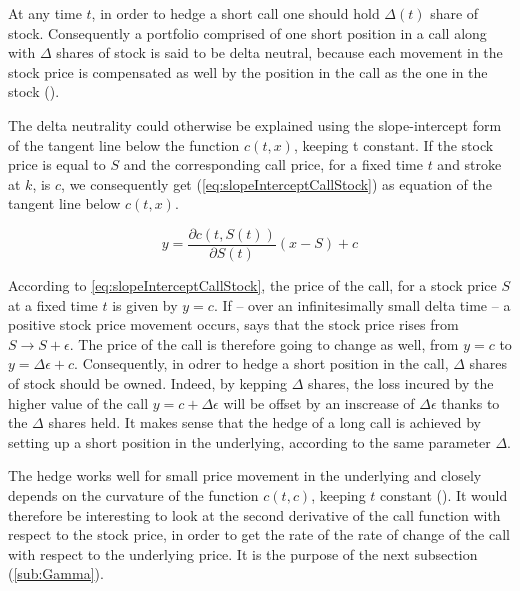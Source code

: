\documentclass[12pt]{report}
\newcommand{\call}[2]{c\left( #1, #2\right)}
\newcommand{\St}{S\left(t\right)}
\begin{document}
At any time $t$, in order to hedge a short call one should hold $\Delta(t)$ share of stock. Consequently a portfolio comprised of one short position in a call along with $\Delta$ shares of stock is said to be delta neutral, because each movement in the stock price is compensated as well by  the position in the call as the one in the stock (\citet{hull}).

The delta neutrality could otherwise be explained using the slope-intercept form of the tangent line below the function $\call{t}{x}$, keeping t constant. If the stock price is equal to $S$ and the corresponding call price, for a fixed time $t$ and stroke at $k$, is $c$, we consequently get (\ref{eq:slopeInterceptCallStock}) as equation of the tangent line below $\call{t}{x}$.
\begin{center}
  \begin{equation}
       y  =  \frac{\partial \call{t}{\St}}{\partial \St}  ( x - S) + c
       \label{eq:slopeInterceptCallStock}
  \end{equation}
\end{center}
According to \ref{eq:slopeInterceptCallStock}, the price of the call, for a stock price $S$ at a fixed time $t$ is given by $y = c$.
If -- over an infinitesimally small delta time -- a positive stock price movement occurs, says that the stock price rises from $S \to S + \epsilon$. The price of the call is therefore going to change as well, from $y = c$ to $y = \Delta \epsilon + c$.
Consequently, in odrer to hedge a short position in the call, $\Delta$ shares of stock should be owned. Indeed, by kepping $\Delta$ shares, the loss incured by the higher value of the call $y = c + \Delta \epsilon$ will be offset by an inscrease of $\Delta \epsilon$ thanks to the $\Delta$ shares held.
It makes sense that the hedge of a long call is achieved by setting up a short position in the underlying, according to the same parameter $\Delta$.

The hedge works well for small price movement in the underlying and closely depends on the curvature of the function $\call{t}{c}$, keeping $t$ constant (\citet{shreve}).
It would therefore be interesting to look at the second derivative of the call function with respect to the stock price, in order to get the rate of the rate of change of the call with respect to the underlying price.
It is the purpose of the next subsection (\ref{sub:Gamma}).


\end{document}
